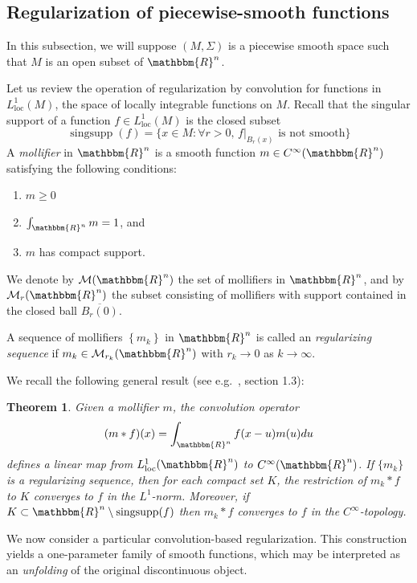 \documentclass[11pt,psamsfonts]{article}
\newcommand{\tmem}[1]{{\em #1\/}}
\newcommand{\tmop}[1]{\ensuremath{\operatorname{#1}}}
\newenvironment{enumeratenumeric}{\begin{enumerate}[1.] }{\end{enumerate}}
\newtheorem{Theorem}{Theorem}[section]
\theoremstyle{definition}
\theoremstyle{remark}
\newcommand{\cR}{\ensuremath{\mathbbm{R}}}
\newcommand{\Mol}{\mathcal{M}}
\begin{document}
\subsection{Regularization of piecewise-smooth functions}\label{subsection-regularizafcn}
In this subsection, we will suppose $(M,\Sigma)$ is a piecewise smooth space such that $M$ is an open subset of $\cR^n$.

Let us review the operation of regularization by convolution for functions in $L^1_{\mathrm{loc}}(M)$, the space of locally integrable functions on $M$. Recall that the singular support of a function $f \in L^1_{\mathrm{loc}}(M)$ is the closed subset
$$\tmop{singsupp} (f)=\{x \in M : \forall r>0,\, f|_{B_r(x)} \text{ is not smooth}\}$$ 
 A \tmem{mollifier} in $\cR^n$ is a smooth function $m\in C^\infty(\cR^n)$ satisfying the
following conditions: \
\begin{enumeratenumeric}
  \item $m \ge  0$
  \item $\int_{\cR^n} m = 1$, and
  \item $m$ has compact support. 
\end{enumeratenumeric}
We denote by $\Mol(\cR^n)$ the set of mollifiers in $\cR^n$, and by $\Mol_r(\cR^n)$ the subset consisting of mollifiers with support contained in the closed ball $\overline{B_r(0)}$. 

A sequence of mollifiers $\left\{ {m_k} 
\right\}$ in $\cR^n$ is called an {\tmem{regularizing sequence}} if $m_k \in
\Mol_{r_k}(\cR^n)$ with $r_k \rightarrow 0$ as $k \rightarrow \infty$.

We recall the following general result (see e.g.~\cite{HormanderI}, section 1.3):
\begin{Theorem}\label{rem-conv}Given a mollifier $m$, the convolution operator
  \[ (m \ast f) (x) = \int_{\cR^n} f (x - u) m (u) d u \]
  defines a linear map from $L^1_{\tmop{loc}} (\cR^n)$ to $C^{\infty}
  (\cR^n)$. If $\{ m_k \}$ is a regularizing sequence, then for each
  compact set $K$, the restriction of $m_k \ast f$ to $K$ converges to $f$ in
  the $L^1$-norm. Moreover, if $K \subset \cR^n \setminus
  \tmop{singsupp} (f)$ then $m_k \ast f$ converges to $f$ in the $C^{\infty}$-topology.
\end{Theorem}
We now consider a particular 
convolution-based regularization. This construction yields a one-parameter family 
of smooth functions, which may be interpreted as an \emph{unfolding} of the original 
discontinuous object.
\end{document}
